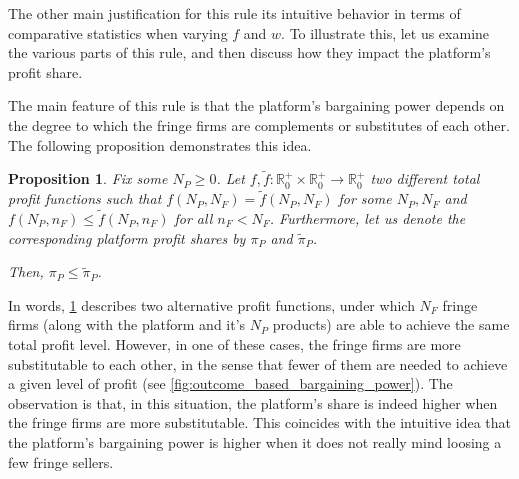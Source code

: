 \documentclass[a4paper]{article}
\newtheorem{proposition}{Proposition}
\begin{document}
The other main justification for this rule its intuitive behavior in terms of comparative statistics when varying $f$ and $w$.
To illustrate this, let us examine the various parts of this rule, and then discuss how they impact the platform's profit share.

The main feature of this rule is that the platform's bargaining power depends on the degree to which the fringe firms are complements or substitutes of each other.
The following proposition demonstrates this idea.
\begin{proposition}
    \label{prop:outcome_based_bargaining_power}
    Fix some $N_P \geq 0$. Let $f, \tilde{f}: \mathbb{R}^+_0 \times \mathbb{R}^+_0 \to \mathbb{R}^+_0$ two different total profit functions such that $f(N_P, N_F) = \tilde{f}(N_P, N_F)$ for some $N_P, N_F$ and $f(N_P, n_F) \leq \tilde{f}(N_P, n_F)$ for all $n_F < N_F$.
    Furthermore, let us denote the corresponding platform profit shares by $\pi_P$ and $\tilde{\pi}_P$.
    
    Then, $\pi_P \leq \tilde{\pi}_P$.
\end{proposition}

In words, \cref{prop:outcome_based_bargaining_power} describes two alternative profit functions, under which $N_F$ fringe firms (along with the platform and it's $N_P$ products) are able to achieve the same total profit level.
However, in one of these cases, the fringe firms are more substitutable to each other, in the sense that fewer of them are needed to achieve a given level of profit (see \cref{fig:outcome_based_bargaining_power}).
The observation is that, in this situation, the platform's share is indeed higher when the fringe firms are more substitutable.
This coincides with the intuitive idea that the platform's bargaining power is higher when it does not really mind loosing a few fringe sellers.
\end{document}
